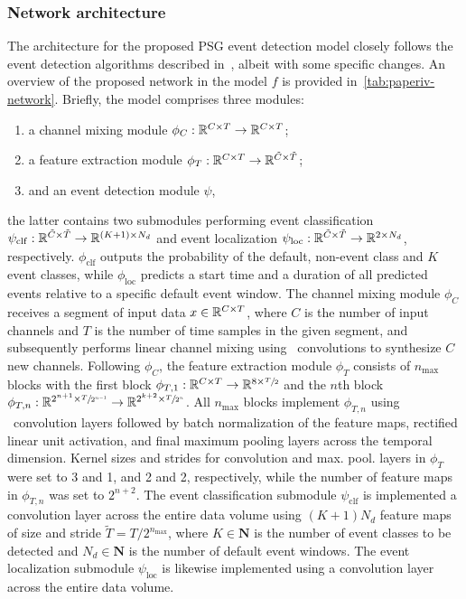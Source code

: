 \subsubsection{Network architecture}
The architecture for the proposed \ac{PSG} event detection model closely follows the event detection algorithms described in~\cite{Chambon2018b,Chambon2019}, albeit with some specific changes.
An overview of the proposed network in the model $f$ is provided in~\cref{tab:paperiv-network}.
Briefly, the model comprises three modules:
\begin{enumerate}
\item a channel mixing module $\phi_{C} : \mathbb{R}^{C \times T} \to \mathbb{R}^{C \times T}$;
\item a feature extraction module $\phi_{T} : \mathbb{R}^{C \times T} \to \mathbb{R}^{\tilde{C} \times \tilde{T}}$;
\item and an event detection module $\psi$,
\end{enumerate}
the latter contains two submodules performing event classification $\psi_{\mathrm{clf}} : \mathbb{R}^{\tilde{C} \times \tilde{T}} \to \mathbb{R}^{(K+1)\times N_{d}} $ and event localization $\psi_{\mathrm{loc}} : \mathbb{R}^{\tilde{C} \times \tilde{T}} \to \mathbb{R}^{2 \times N_{d}}$, respectively.
$\phi_{\mathrm{clf}}$ outputs the probability of the default, non-event class and $K$ event classes, while $\phi_{\mathrm{loc}}$ predicts a start time and a duration of all predicted events relative to a specific default event window.
The channel mixing module $\phi_{C}$ receives a segment of input data $x \in \mathbb{R}^{C \times T}$, where $C$ is the number of input channels and $T$ is the number of time samples in the given segment, and subsequently performs linear channel mixing using \oned~convolutions to synthesize $C$ new channels. 
Following $\phi_{C}$, the feature extraction module $\phi_{T}$ consists of $n_{\max}$ blocks with the first block $\phi_{T,1} : \mathbb{R}^{C \times T} \to \mathbb{R}^{8 \times \sfrac{T}{2}}$ and the $n$th block $\phi_{T,n} : \mathbb{R}^{2^{n+1} \times \sfrac{T}{2^{n-1}}} \to \mathbb{R}^{2^{k+2} \times \sfrac{T}{2^{n}}}$.
All $n_{\max}$ blocks implement $\phi_{T,n}$ using \oned~convolution layers followed by batch normalization of the feature maps, rectified linear unit activation, and final \oned maximum pooling layers across the temporal dimension.
Kernel sizes and strides for convolution and max. pool. layers in $\phi_{T}$ were set to 3 and 1, and 2 and 2, respectively, while the number of feature maps in $\phi_{T,n}$ was set to $2^{n+2}$.
The event classification submodule $\psi_{\mathrm{clf}}$ is implemented a \oned convolution layer across the entire data volume using $(K+1)N_{d}$ feature maps of size and stride $\tilde{T} = T/2^{n_{\max}}$, where $K \in \mathbf{N}$ is the number of event classes to be detected and $N_{d} \in \mathbf{N}$ is the number of default event windows.
The event localization submodule $\psi_{\mathrm{loc}}$ is likewise implemented using a \oned convolution layer across the entire data volume.

